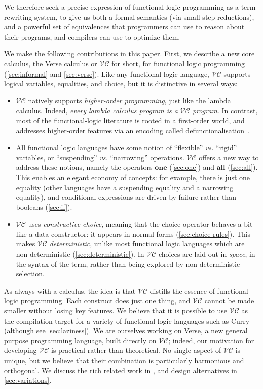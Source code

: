 \documentclass[acmsmall,review,dvipsnames]{acmart}
\newcommand{\vs}{\emph{vs.}}
\newcommand{\versecalc}{$\mathcal{VC}$}
\begin{document}
We therefore seek a precise expression of functional logic programming as
a term-rewriting system, to give us both a formal semantics (via small-step reductions),
and a powerful set of equivalences that programmers can use to reason about their programs,
and compilers can use to optimize them.

We make the following contributions in this paper.
First, we describe a new core calculus, the Verse calculus or \versecalc{} for short,
for functional logic programming (\cref{sec:informal} and \ref{sec:verse}).
Like any functional logic language,
\versecalc{} supports logical variables, equalities, and choice, but it is distinctive in several ways:
\begin{itemize}
\item \versecalc{} natively supports \emph{higher-order programming}, just like the lambda calculus.
  Indeed, \emph{every lambda calculus program is a \versecalc{} program}.
  In contrast, most of the functional-logic literature is rooted in a first-order world, and
  addresses higher-order features via an encoding called defunctionalisation~\cite[3.3]{hanus:survey}.
\item All functional logic languages have some notion of ``flexible'' {\vs} ``rigid'' variables,
  or ``suspending'' {\vs} ``narrowing'' operations.  \versecalc{} offers a new
  way to address these notions, namely the operators \ensuremath{\textbf{one}} (\cref{sec:one})
  and \ensuremath{\textbf{all}} (\cref{sec:all}).  This enables an elegant economy of concepts: for example,
  there is just one equality (other languages have a suspending equality and a narrowing equality),
  and conditional expressions are driven by failure rather than booleans (\cref{sec:if}).
\item \versecalc{} uses \emph{constructive choice}, meaning that the choice operator behaves
  a bit like a data constructor: it appears in normal forms (\cref{sec:choice-rules}).
  This makes \versecalc{} \emph{deterministic}, unlike most
  functional logic languages which are non-deterministic (\cref{sec:deterministic}).
  In \versecalc{} choices are laid out in \emph{space},
  in the syntax of the term, rather than being explored by non-deterministic selection.
\end{itemize}
As always with a calculus, the idea is that \versecalc{} distills the essence of functional logic programming.
Each construct does just one thing, and \versecalc{} cannot be made smaller without losing key features.
We believe that it is possible to use \versecalc{} as the compilation target for a variety of
functional logic languages such as Curry~\cite{hanus:curry-report} (although see \cref{sec:laziness}).
We are ourselves working on Verse, a new general purpose programming language, built directly on \versecalc{}; indeed,
our motivation for developing \versecalc{} is practical rather than theoretical.
No single aspect of \versecalc{} is unique, but we believe that their combination
is particularly harmonious and orthogonal.
We discuss the rich related work in , and design alternatives in \cref{sec:variations}.
\end{document}
